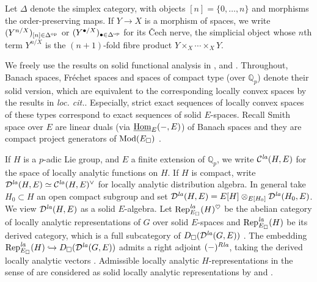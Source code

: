 \documentclass[a4paper,10pt]{amsart}
\theoremstyle{remark}
\theoremstyle{definition}
\theoremstyle{plain}
\numberwithin{equation}{section}
\newcommand{\bbQ}{{\mathbb Q}}
\newcommand{\calC}{{\mathcal C}}
\newcommand{\calD}{{\mathcal D}}
\newcommand{\Hom}{{\rm Hom}}
\newcommand{\uHom}{\underline{\Hom}}
\newcommand{\la}{{\it la}}
\newcommand{\Mod}{{\rm Mod}}
\newcommand{\Rep}{{\rm Rep}}
\begin{document}
Let $\Delta$ denote the simplex category, with objects $[n]=\{0,\ldots,n\}$ and morphisms the order-preserving maps. If $Y\to X$ is a morphism of spaces, we write $(Y^{n/X})_{[n]\in \Delta^{\rm op}}$ or $(Y^{\bullet/X})_{\bullet\in \Delta^{\rm op}}$ for its \v{C}ech nerve, the simplicial object whose $n$th term $Y^{n/X}$ is the $(n+1)$-fold fibre product $Y\times_X \cdots \times_X Y$.

We freely use the results on solid functional analysis in \cite[Appendix A]{bosco2021drinfeldproetale}, \cite[\S~3]{rodrigues2022solid} and \cite[\S~2.2]{colmez2023arithmeticduality}. Throughout, Banach spaces, Fr\'echet spaces and spaces of compact type (over $\bbQ_p$) denote their solid version, which are equivalent to the corresponding locally convex spaces by the results in \textit{loc. cit.}. Especially, strict exact sequences of locally convex spaces of these types correspond to exact sequences of solid $E$-spaces. Recall Smith space over $E$ are linear duals (via $\uHom_E(-,E)$) of Banach spaces and they are compact project generators of $\Mod(E_{\square})$ \cite[Lem.~3.8]{rodrigues2022solid}.

If $H$ is a $p$-adic Lie group, and $E$ a finite extension of $\bbQ_p$, we write $\calC^{\la}(H,E)$ for the space of locally analytic functions on $H$. If $H$ is compact, write $\calD^{\la}(H,E)\simeq \calC^{\la}(H,E)^{\vee}$ for locally analytic distribution algebra. In general take $H_0\subset H$ an open compact subgroup and set $\calD^{\la}(H,E)=E[H]\otimes_{E[H_0]}\calD^{\la}(H_0,E)$. We view $\calD^{\la}(H,E)$ as a solid $E$-algebra. Let $\Rep^{\la}_{E_\square}(H)^{\heartsuit}$ be the abelian category of locally analytic representations of $G$ over solid $E$-spaces and $\Rep^{\la}_{E_\square}(H)$ be its derived category, which is a full subcategory of $D_{\square}(\calD^{\la}(G,E))$ \cite[Def.~3.3.1, Prop.~3.3.6]{JC23}. The embedding $\Rep^{\la}_{E_\square}(H)\hookrightarrow D_{\square}(\calD^{\la}(G,E))$ admits a right adjoint $(-)^{R\la}$, taking the derived locally analytic vectors \cite[Cor.~3.3.7]{JC23}. Admissible locally analytic $H$-representations in the sense of \cite{ST03} are considered as solid locally analytic representations by
\cite[Prop.~4.42]{rodrigues2022solid} and
\cite[Prop.~4.2.7]{JC23}.
\end{document}
